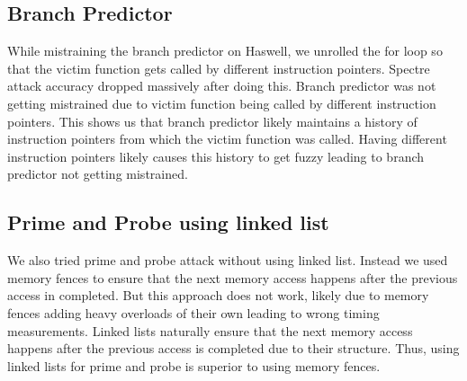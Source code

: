 \subsection{Branch Predictor}
\indent While mistraining the branch predictor on Haswell, we unrolled the for loop so that the victim function gets called by different instruction pointers. Spectre attack accuracy dropped massively after doing this. Branch predictor was not getting mistrained due to victim function being called by different instruction pointers. This shows us that branch predictor likely maintains a history of instruction pointers from which the victim function was called. Having different instruction pointers likely causes this history to get fuzzy leading to branch predictor not getting mistrained.

\subsection{Prime and Probe using linked list}
\indent We also tried prime and probe attack without using linked list. Instead we used memory fences to ensure that the next memory access happens after the previous access in completed. But this approach does not work, likely due to memory fences adding heavy overloads of their own leading to wrong timing measurements. Linked lists naturally ensure that the next memory access happens after the previous access is completed due to their structure. Thus, using linked lists for prime and probe is superior to using memory fences. \\
